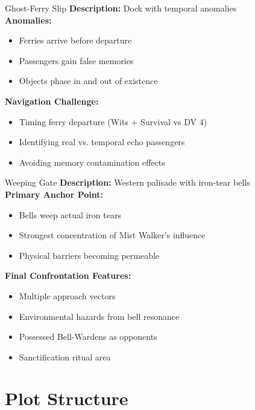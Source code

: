 \documentclass[11pt]{article}
\begin{document}
\begin{locationbox}{Ghost-Ferry Slip}
    \textbf{Description:} Dock with temporal anomalies \\
    \textbf{Anomalies:}
    \begin{itemize}
        \item Ferries arrive before departure
        \item Passengers gain false memories
        \item Objects phase in and out of existence
    \end{itemize}
    \textbf{Navigation Challenge:}
    \begin{itemize}
        \item Timing ferry departure (Wits + Survival vs DV 4)
        \item Identifying real vs. temporal echo passengers
        \item Avoiding memory contamination effects
    \end{itemize}
\end{locationbox}

\begin{locationbox}{Weeping Gate}
    \textbf{Description:} Western palisade with iron-tear bells \\
    \textbf{Primary Anchor Point:}
    \begin{itemize}
        \item Bells weep actual iron tears
        \item Strongest concentration of Mist Walker's influence
        \item Physical barriers becoming permeable
    \end{itemize}
    \textbf{Final Confrontation Features:}
    \begin{itemize}
        \item Multiple approach vectors
        \item Environmental hazards from bell resonance
        \item Possessed Bell-Wardens as opponents
        \item Sanctification ritual area
    \end{itemize}
\end{locationbox}

\section*{Plot Structure}
\end{document}
